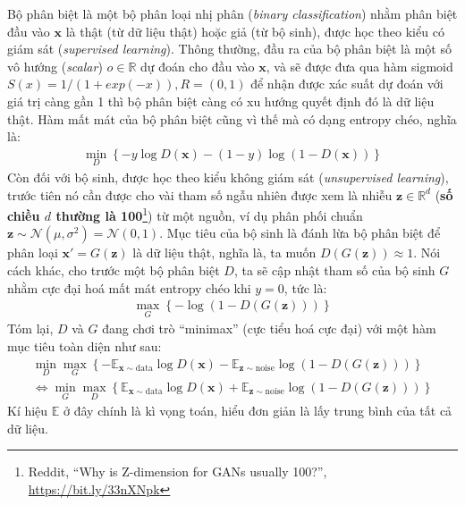 \documentclass[a4paper]{article}
\begin{document}
\noindent
Bộ phân biệt là một bộ phân loại nhị phân (\textit{binary classification}) nhằm phân biệt đầu vào $\mathbf{x}$ là thật (từ dữ liệu thật) hoặc giả (từ bộ sinh), được học theo kiểu có giám sát (\textit{supervised learning}). Thông thường, đầu ra của bộ phân biệt là một số vô hướng (\textit{scalar}) $o \in \mathbb{R}$ dự đoán cho đầu vào $\mathbf{x}$, và sẽ được đưa qua hàm sigmoid $S(x) = 1/(1+exp(-x)), R = (0, 1)$ để nhận được xác suất dự đoán với giá trị càng gần 1 thì bộ phân biệt càng có xu hướng quyết định đó là dữ liệu thật. Hàm mất mát của bộ phân biệt cũng vì thế mà có dạng entropy chéo, nghĩa là:
\begin{align*}
    \min_{D}\left\{-y\log D\left(\mathbf{x}\right) - \left(1-y\right)\log\left(1-D\left(\mathbf{x}\right)\right)\right\}
\end{align*}
Còn đối với bộ sinh, được học theo kiểu không giám sát (\textit{unsupervised learning}), trước tiên nó cần được cho vài tham số ngẫu nhiên được xem là nhiễu $\mathbf{z} \in \mathbb{R}^d$ (\textbf{số chiều $d$ thường là 100}\footnote{Reddit, ``Why is Z-dimension for GANs usually 100?'', \href{https://bit.ly/33nXNpk}{https://bit.ly/33nXNpk}}) từ một nguồn, ví dụ phân phối chuẩn $\mathbf{z} \sim \mathcal{N}\left(\mu, \sigma^2\right)=\mathcal{N}\left(0, 1\right)$. Mục tiêu của bộ sinh là đánh lừa bộ phân biệt để phân loại $\mathbf{x'} = G\left(\mathbf{z}\right)$ là dữ liệu thật, nghĩa là, ta muốn $D\left(G\left(\mathbf{z}\right)\right) \approx 1$. Nói cách khác, cho trước một bộ phân biệt $D$, ta sẽ cập nhật tham số của bộ sinh $G$ nhằm cực đại hoá mất mát entropy chéo khi $y=0$, tức là:
\begin{align*}
    \max_G\left\{-\log\left(1-D\left(G\left(\mathbf{z}\right)\right)\right)\right\}
\end{align*}
Tóm lại, $D$ và $G$ đang chơi trò ``minimax'' (cực tiểu hoá cực đại) với một hàm mục tiêu toàn diện như sau:
\begin{align*}
    \min_D\max_G\left\{-\mathbb{E}_{\mathbf{x}\sim \text{data}}\log D\left(\mathbf{x}\right)-\mathbb{E}_{\mathbf{z} \sim \text{noise}}\log\left(1-D\left(G\left(\mathbf{z}\right)\right)\right)\right\}\\
    \Leftrightarrow \min_G\max_D\left\{\mathbb{E}_{\mathbf{x}\sim \text{data}}\log D\left(\mathbf{x}\right)+\mathbb{E}_{\mathbf{z} \sim \text{noise}}\log\left(1-D\left(G\left(\mathbf{z}\right)\right)\right)\right\}
\end{align*}
Kí hiệu $\mathbb{E}$ ở đây chính là kì vọng toán, hiểu đơn giản là lấy trung bình của tất cả dữ liệu.
\end{document}
